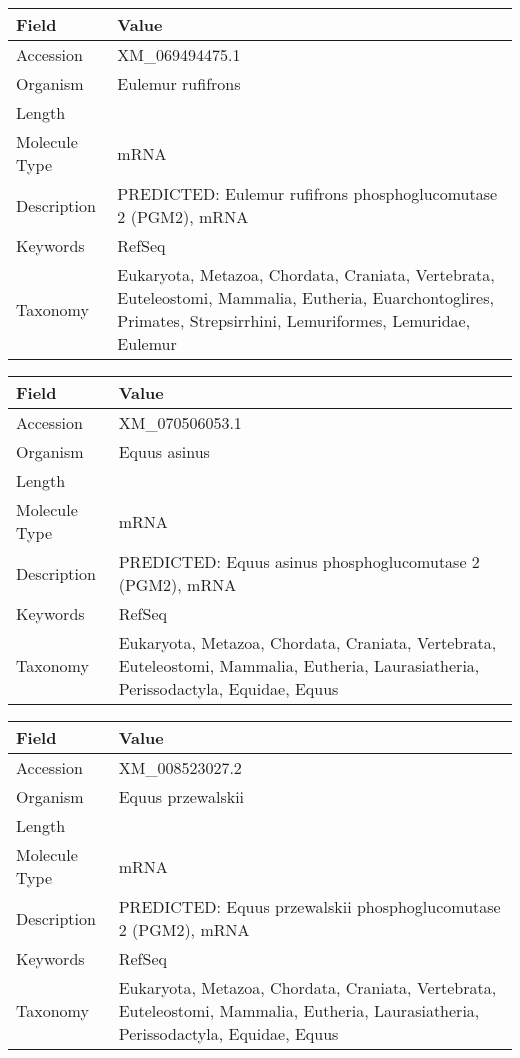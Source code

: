 \documentclass[10pt]{article}
\begin{document}
{\footnotesize
\begin{longtable}{>{\raggedright\arraybackslash}p{4.5cm} >{\raggedright\arraybackslash}p{11.5cm}}
\textbf{Field} & \textbf{Value} \\
\hline
Accession & XM\_069494475.1 \\
Organism & Eulemur rufifrons \\
Length & 3204 \\
Molecule Type & mRNA \\
Description & PREDICTED: Eulemur rufifrons phosphoglucomutase 2 (PGM2), mRNA \\
Keywords & RefSeq \\
Taxonomy & Eukaryota, Metazoa, Chordata, Craniata, Vertebrata, Euteleostomi, Mammalia, Eutheria, Euarchontoglires, Primates, Strepsirrhini, Lemuriformes, Lemuridae, Eulemur \\
\end{longtable}
}

{\footnotesize
\begin{longtable}{>{\raggedright\arraybackslash}p{4.5cm} >{\raggedright\arraybackslash}p{11.5cm}}
\textbf{Field} & \textbf{Value} \\
\hline
Accession & XM\_070506053.1 \\
Organism & Equus asinus \\
Length & 2941 \\
Molecule Type & mRNA \\
Description & PREDICTED: Equus asinus phosphoglucomutase 2 (PGM2), mRNA \\
Keywords & RefSeq \\
Taxonomy & Eukaryota, Metazoa, Chordata, Craniata, Vertebrata, Euteleostomi, Mammalia, Eutheria, Laurasiatheria, Perissodactyla, Equidae, Equus \\
\end{longtable}
}

{\footnotesize
\begin{longtable}{>{\raggedright\arraybackslash}p{4.5cm} >{\raggedright\arraybackslash}p{11.5cm}}
\textbf{Field} & \textbf{Value} \\
\hline
Accession & XM\_008523027.2 \\
Organism & Equus przewalskii \\
Length & 4403 \\
Molecule Type & mRNA \\
Description & PREDICTED: Equus przewalskii phosphoglucomutase 2 (PGM2), mRNA \\
Keywords & RefSeq \\
Taxonomy & Eukaryota, Metazoa, Chordata, Craniata, Vertebrata, Euteleostomi, Mammalia, Eutheria, Laurasiatheria, Perissodactyla, Equidae, Equus \\
\end{longtable}
}
\end{document}
